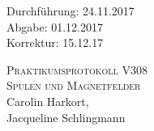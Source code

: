 

\begin{titlepage}
  \begin{flushleft}
 Durchführung: 24.11.2017\\
 Abgabe: 01.12.2017 \\
 Korrektur: 15.12.17
  \end{flushleft}



 \begin{center}


\textsc{\LARGE Praktikumsprotokoll V308}\\[1.5cm]
\textsc{\huge Spulen und Magnetfelder} \\[5,5cm]

Carolin Harkort\footnotemark[1], \\
Jacqueline Schlingmann\footnotemark[2] \\[1,0cm]



 \end{center}

 \vfill

\end{titlepage}


  
  
  

\printbibliography

